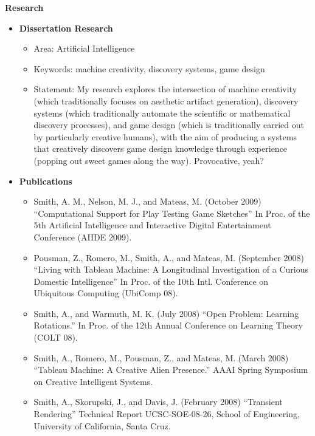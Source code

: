\documentclass[10pt]{article}
\begin{document}
{\large \textbf{Research}}
\begin{itemize}

\item
    \textbf{Dissertation Research}
    \begin{itemize}
        \item Area: Artificial Intelligence
        \item Keywords: machine creativity, discovery systems, game design
        \item Statement: My research explores the intersection of machine creativity (which traditionally focuses on aesthetic artifact generation), discovery systems (which traditionally automate the scientific or mathematical discovery processes), and game design (which is traditionally carried out by particularly creative humans), with the aim of producing a systems that creatively discovers game design knowledge through experience (popping out sweet games along the way). Provocative, yeah?
    \end{itemize}
 
\item 
    \textbf{Publications}
    \begin{itemize}
        \item Smith, A. M., Nelson, M. J., and Mateas, M. (October 2009) ``Computational Support for Play Testing Game Sketches'' In Proc. of the 5th Artificial Intelligence and Interactive Digital Entertainment Conference (AIIDE 2009).
        \item Pousman, Z., Romero, M., Smith, A., and Mateas, M. (September 2008) ``Living with Tableau Machine: A Longitudinal Investigation of a Curious Domestic Intelligence'' In Proc. of the 10th Intl. Conference on Ubiquitous Computing (UbiComp 08).
        \item Smith, A., and Warmuth, M. K. (July 2008) ``Open Problem: Learning Rotations.'' In Proc. of the 12th Annual Conference on Learning Theory (COLT 08).
        \item Smith, A., Romero, M., Pousman, Z., and Mateas, M. (March 2008) ``Tableau Machine: A Creative Alien Presence.'' AAAI Spring Symposium on Creative Intelligent Systems. 
        \item Smith, A., Skorupski, J., and Davis, J. (February 2008) ``Transient Rendering'' Technical Report UCSC-SOE-08-26, School of Engineering, University of California, Santa Cruz.
  \end{itemize}
  

\end{itemize}
\end{document}
